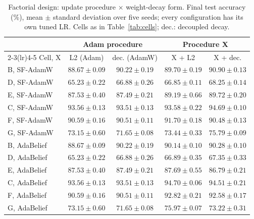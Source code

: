 \begin{table}[!t]
\caption{Factorial design: update procedure $\times$ weight-decay form. Final test accuracy (\%), mean $\pm$ standard deviation over five seeds; every configuration has its own tuned LR. Cells as in Table~\ref{tab:cells}; dec.: decoupled decay.}
\label{tab:2x2}
\centering
\footnotesize
\setlength{\tabcolsep}{4pt}
\begin{tabular}{@{}lcccc@{}}
\toprule
 & \multicolumn{2}{c}{Adam procedure} & \multicolumn{2}{c}{Procedure X} \\
\cmidrule(lr){2-3}\cmidrule(lr){4-5}
Cell, X & L2 (Adam) & dec. (AdamW) & X + L2 & X + dec. \\
\midrule
B, SF-AdamW & $88.67\pm0.09$ & $90.22\pm0.19$ & $89.70\pm0.19$ & $90.90\pm0.13$ \\
D, SF-AdamW & $65.23\pm0.22$ & $66.88\pm0.26$ & $66.85\pm0.11$ & $68.25\pm0.14$ \\
E, SF-AdamW & $87.53\pm0.40$ & $87.49\pm0.21$ & $89.19\pm0.66$ & $89.72\pm0.20$ \\
C, SF-AdamW & $93.56\pm0.13$ & $93.51\pm0.13$ & $93.58\pm0.22$ & $94.69\pm0.10$ \\
F, SF-AdamW & $90.59\pm0.16$ & $90.51\pm0.11$ & $91.70\pm0.18$ & $90.48\pm0.13$ \\
G, SF-AdamW & $73.15\pm0.60$ & $71.65\pm0.08$ & $73.44\pm0.33$ & $75.79\pm0.09$ \\
\midrule
B, AdaBelief & $88.67\pm0.09$ & $90.22\pm0.19$ & $90.14\pm0.10$ & $90.28\pm0.10$ \\
D, AdaBelief & $65.23\pm0.22$ & $66.88\pm0.26$ & $66.89\pm0.35$ & $67.35\pm0.33$ \\
E, AdaBelief & $87.53\pm0.40$ & $87.49\pm0.21$ & $87.69\pm0.55$ & $86.79\pm0.21$ \\
C, AdaBelief & $93.56\pm0.13$ & $93.51\pm0.13$ & $94.70\pm0.06$ & $94.51\pm0.21$ \\
F, AdaBelief & $90.59\pm0.16$ & $90.51\pm0.11$ & $92.82\pm0.21$ & $92.58\pm0.17$ \\
G, AdaBelief & $73.15\pm0.60$ & $71.65\pm0.08$ & $75.97\pm0.07$ & $73.22\pm0.31$ \\
\bottomrule
\end{tabular}
\end{table}
